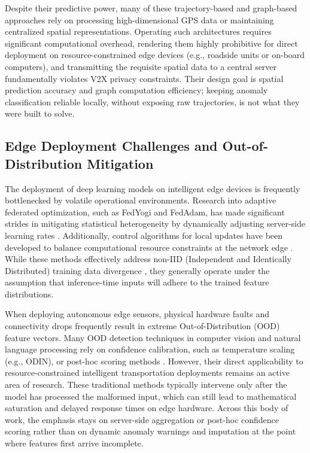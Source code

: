 Despite their predictive power, many of these trajectory-based and graph-based approaches rely on processing high-dimensional GPS data or maintaining centralized spatial representations. Operating such architectures requires significant computational overhead, rendering them highly prohibitive for direct deployment on resource-constrained edge devices (e.g., roadside units or on-board computers), and transmitting the requisite spatial data to a central server fundamentally violates V2X privacy constraints. Their design goal is spatial prediction accuracy and graph computation efficiency; keeping anomaly classification reliable locally, without exposing raw trajectories, is not what they were built to solve.

\subsection{Edge Deployment Challenges and Out-of-Distribution Mitigation}

The deployment of deep learning models on intelligent edge devices is frequently bottlenecked by volatile operational environments. Research into adaptive federated optimization, such as FedYogi and FedAdam, has made significant strides in mitigating statistical heterogeneity by dynamically adjusting server-side learning rates \cite{Yang_2024}. Additionally, control algorithms for local updates have been developed to balance computational resource constraints at the network edge \cite{Wang_2020}. While these methods effectively address non-IID (Independent and Identically Distributed) training data divergence \cite{Lu_2024}, they generally operate under the assumption that inference-time inputs will adhere to the trained feature distributions. 

When deploying autonomous edge sensors, physical hardware faults and connectivity drops frequently result in extreme Out-of-Distribution (OOD) feature vectors. Many OOD detection techniques in computer vision and natural language processing rely on confidence calibration, such as temperature scaling (e.g., ODIN), or post-hoc scoring methods \cite{Shalev_2022}. However, their direct applicability to resource-constrained intelligent transportation deployments remains an active area of research. These traditional methods typically intervene only after the model has processed the malformed input, which can still lead to mathematical saturation and delayed response times on edge hardware. Across this body of work, the emphasis stays on server-side aggregation or post-hoc confidence scoring rather than on dynamic anomaly warnings and imputation at the point where features first arrive incomplete.

